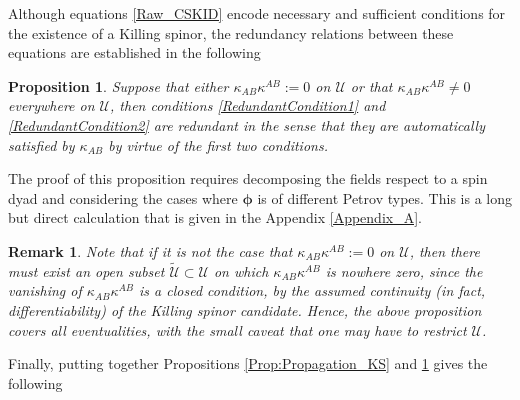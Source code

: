 \documentclass[10pt,a4paper]{article}
\theoremstyle{plain}
\newtheorem{proposition}{Proposition}
\newtheorem{remark}{Remark}
\begin{document}
Although equations \eqref{Raw_CSKID} encode
necessary and sufficient conditions for the existence of a
Killing spinor, the redundancy relations between these equations are established
in the following
\begin{proposition}\label{prop_remove_redundant_conditions}
Suppose that either $\kappa_{AB}\kappa^{AB}:= 0$ on $\mathcal{U}$ or
that $\kappa_{AB}\kappa^{AB}\neq 0$ everywhere on $\mathcal{U}$, then
conditions \eqref{RedundantCondition1} and \eqref{RedundantCondition2}
are redundant in the sense that they are automatically satisfied by
$\kappa_{AB}$ by virtue of the first two conditions.
\end{proposition}

The proof of this proposition requires decomposing the fields respect to a spin dyad
and considering the cases where $\bm\phi$ is of different Petrov types.
This is a long but direct calculation that is given in the Appendix \ref{Appendix_A}.


\begin{remark}{\em 
Note that if it is not the case that $\kappa_{AB}\kappa^{AB}:= 0$ on
$\mathcal{U}$, then there must exist an open subset
$\tilde{\mathcal{U}}\subset\mathcal{U}$ on which
$\kappa_{AB}\kappa^{AB}$ is nowhere zero, since the vanishing of
$\kappa_{AB}\kappa^{AB}$ is a closed condition, by the assumed
continuity (in fact, differentiability) of the Killing spinor
candidate. Hence, the above proposition covers all eventualities, with
the small caveat that one may have to restrict $\mathcal{U}$.  }
\end{remark}

\noindent
Finally, putting together Propositions
\ref{Prop:Propagation_KS} and \ref{prop_remove_redundant_conditions}
gives the following
\end{document}
